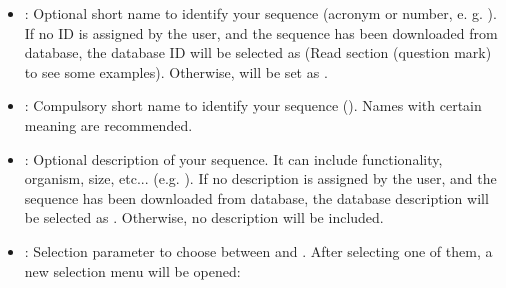 \begin{itemize}
  \begin{itemize}
  \item {}: Optional short name to identify your sequence (acronym or number, e. g. ). If no ID is assigned by the user, and the sequence has been downloaded from  database, the database ID will be selected as  (Read  section (question mark) to see some examples). Otherwise,  will be set as .
  \item {}: Compulsory short name to identify your sequence (). Names with certain meaning are recommended.
  \item {}: Optional description of your sequence. It can include functionality, organism, size, etc... (e.g. ). If no description is assigned by the user, and the sequence has been downloaded from  database, the database description will be selected as . Otherwise, no description will be included.
  \item {}: Selection parameter to choose between  and . After selecting one of them, a new selection menu will be opened:
  

\end{itemize}
\end{itemize}
